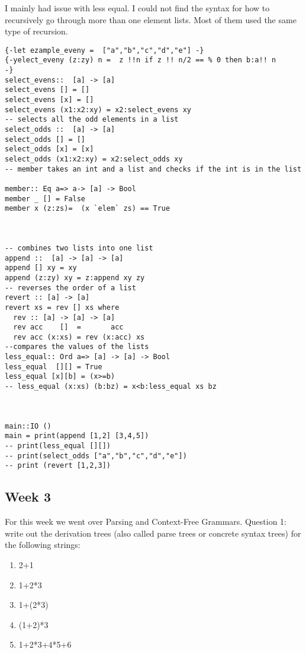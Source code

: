 \documentclass{article}
\theoremstyle{theorem}
\theoremstyle{definition}
\theoremstyle{remark}
\begin{document}
\begin{enumerate}
\begin{enumerate}
\begin{enumerate}
I mainly had issue with less equal. I could not find the syntax for how to recursively go through more than one element lists. Most of them used the same type of recursion.


\begin{lstlisting}
{-let ezample_eveny =  ["a","b","c","d","e"] -}
{-yelect_eveny (z:zy) n =  z !!n if z !! n/2 == % 0 then b:a!! n 
-}
select_evens::  [a] -> [a]
select_evens [] = []
select_evens [x] = []
select_evens (x1:x2:xy) = x2:select_evens xy
-- selects all the odd elements in a list
select_odds ::  [a] -> [a]
select_odds [] = []
select_odds [x] = [x]
select_odds (x1:x2:xy) = x2:select_odds xy
-- member takes an int and a list and checks if the int is in the list

member:: Eq a=> a-> [a] -> Bool
member _ [] = False
member x (z:zs)=  (x `elem` zs) == True



-- combines two lists into one list
append ::  [a] -> [a] -> [a]
append [] xy = xy
append (z:zy) xy = z:append xy zy
-- reverses the order of a list
revert :: [a] -> [a]
revert xs = rev [] xs where
  rev :: [a] -> [a] -> [a] 
  rev acc    []  =       acc
  rev acc (x:xs) = rev (x:acc) xs
--compares the values of the lists
less_equal:: Ord a=> [a] -> [a] -> Bool
less_equal  [][] = True
less_equal [x][b] = (x>=b)
-- less_equal (x:xs) (b:bz) = x<b:less_equal xs bz



main::IO ()
main = print(append [1,2] [3,4,5])
-- print(less_equal [][])
-- print(select_odds ["a","b","c","d","e"])
-- print (revert [1,2,3])
\end{lstlisting}
\subsection{Week 3}
For this week we went over Parsing and Context-Free Grammars.
Question 1:
write out the derivation trees (also called parse trees or concrete syntax trees) for the following strings:
\begin{enumerate}

\item 2+1
\item 1+2*3
\item 1+(2*3)
\item (1+2)*3
\item 1+2*3+4*5+6


\end{enumerate}
\end{enumerate}
\end{enumerate}
\end{enumerate}
\end{document}
